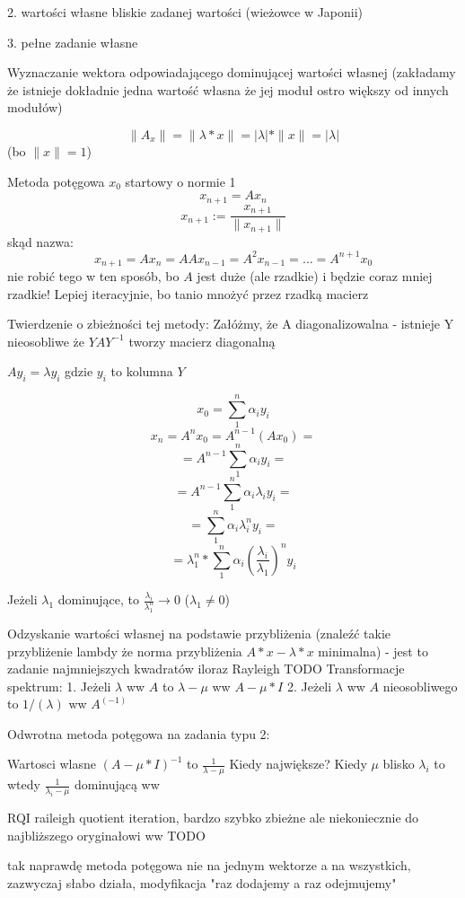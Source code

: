 \documentclass{article}
\begin{document}
2. wartości własne bliskie zadanej wartości (wieżowce w Japonii)

3. pełne zadanie własne

Wyznaczanie wektora odpowiadającego dominującej wartości własnej (zakładamy że istnieje dokładnie jedna wartość własna że jej moduł ostro większy od innych modułów)

$$\|A_x\| = \|\lambda*x\| = |\lambda| * \|x\| = |\lambda| $$ (bo $\|x\| = 1$)

Metoda potęgowa
$x_0$ startowy o normie 1
$$x_{n+1} = A  x_n$$
$$x_{n+1} := \frac{x_{n+1}}{\|x_{n+1}\|} $$
skąd nazwa:
$$x_{n+1} = Ax_n = AAx_{n-1} = A^2x_{n-1} = \dots = A^{n+1}x_0 $$
nie robić tego w ten sposób, bo $A$ jest duże (ale rzadkie) i będzie coraz mniej rzadkie!
Lepiej iteracyjnie, bo tanio mnożyć przez rzadką macierz

Twierdzenie o zbieżności tej metody:
Załóżmy, że A diagonalizowalna - istnieje Y nieosobliwe że
$YAY^{-1}$ tworzy macierz diagonalną

$Ay_i = \lambda y_i$ gdzie $y_i$ to kolumna $Y$

$$ x_0 = \sum_{1}^{n} \alpha_i  y_i $$
$$x_n = A^nx_0 = A^{n-1}(Ax_0) = $$
$$ = A^{n-1}\sum_{1}^{n} \alpha_i y_i = $$
$$ = A^{n-1}\sum_{1}^{n} \alpha_i \lambda_i y_i = $$
$$= \sum_{1}^{n} \alpha_i \lambda_i^n y_i = $$
$$= \lambda_1^n *\sum_{1}^{n} \alpha_i (\frac{\lambda_i}{\lambda_1})^n y_i$$

Jeżeli $\lambda_1$ dominujące, to $\frac{\lambda_i}{\lambda_1^n} \rightarrow 0 $
($\lambda_1 \neq 0 $)

Odzyskanie wartości własnej na podstawie przybliżenia (znaleźć takie przybliżenie lambdy że norma przybliżenia $A*x-\lambda*x$  minimalna) - jest to zadanie najmniejszych kwadratów
iloraz Rayleigh TODO
Transformacje spektrum:
1. Jeżeli $\lambda$ ww $A$ to $\lambda-\mu$ ww $A-\mu*I$
2. Jeżeli $\lambda$ ww $A$ nieosobliwego to $1/(\lambda)$ ww $A^(-1)$

Odwrotna metoda potęgowa na zadania typu 2:

Wartosci wlasne $(A - \mu*I)^{-1}$ to $\frac1{\lambda-\mu} $
Kiedy największe? Kiedy $\mu$ blisko $\lambda_i$ to wtedy $\frac{1}{\lambda_i - \mu}$ dominującą ww

RQI raileigh quotient iteration, bardzo szybko zbieżne ale niekoniecznie do najbliższego oryginałowi ww TODO

tak naprawdę metoda potęgowa nie na jednym wektorze a na wszystkich, zazwyczaj słabo działa, modyfikacja "raz dodajemy a raz odejmujemy"
\end{document}
